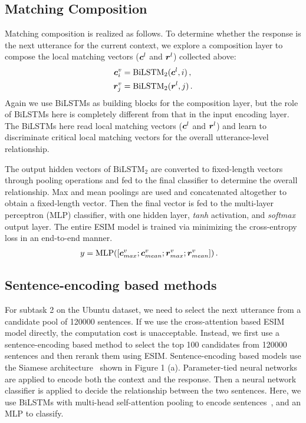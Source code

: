 \documentclass[letterpaper]{article} \usepackage{aaai19}  \usepackage{times}  \usepackage{helvet}  \usepackage{courier}  \usepackage{url}  \usepackage{graphicx}
\begin{document}
\subsection{Matching Composition}
Matching composition is realized as follows. To determine whether the response is the next utterance for the current context, we explore a composition layer to compose the local matching vectors (${\bm{c}}^l$ and ${\bm{r}}^l$) collected above:
\begin{align}
{\bm{c}}^v_i &= \mathrm{BiLSTM}_2({\bm{c}}^l,i) \,, \\
{\bm{r}}^v_j &= \mathrm{BiLSTM}_2({\bm{r}}^l,j) \,.
\end{align}
Again we use BiLSTMs as building blocks for the composition layer, but the role of BiLSTMs here is completely different from that in the input encoding layer. The BiLSTMs here read local matching vectors (${\bm{c}}^l$ and ${\bm{r}}^l$) and learn to discriminate critical local matching vectors for the overall utterance-level relationship. 

The output hidden vectors of $\mathrm{BiLSTM}_2$ are converted to fixed-length vectors through pooling operations and fed to the final classifier to determine the overall relationship. Max and mean poolings are used and concatenated altogether to obtain a fixed-length vector. Then the final vector is fed to the multi-layer perceptron (MLP) classifier, with one hidden layer, \textit{tanh} activation, and \textit{softmax} output layer. The entire ESIM model is trained via minimizing the cross-entropy loss in an end-to-end manner. 
\begin{align}
y &= \mathrm{MLP}([{\bm{c}}^v_{max};{\bm{c}}^v_{mean};{\bm{r}}^v_{max};{\bm{r}}^v_{mean}]) \,.
\end{align}

\subsection{Sentence-encoding based methods}
For subtask 2 on the Ubuntu dataset, we need to select the next utterance from a candidate pool of 120000 sentences. If we use the cross-attention based ESIM model directly, the computation cost is unacceptable. Instead, we first use a sentence-encoding based method to select the top 100 candidates from 120000 sentences and then rerank them using ESIM. Sentence-encoding based models use the Siamese architecture~\cite{DBLP:conf/nips/BromleyGLSS93,DBLP:conf/repeval/ChenZLWJI17} shown in Figure 1 (a).  Parameter-tied neural networks are applied to encode both the context and the response. Then a neural network classifier is applied to decide the relationship between the two sentences. Here, we use BiLSTMs with multi-head self-attention pooling to encode sentences~\cite{DBLP:journals/corr/LinFSYXZB17,DBLP:conf/coling/ChenLZ18}, and an MLP to classify.
\end{document}

